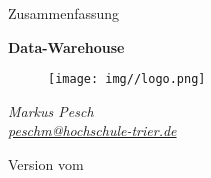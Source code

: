 \begin{titlepage}
  \begin{center}
    \begin{large}
      Zusammenfassung
    \end{large}

    \begin{huge}
      \begin{singlespace}
        \textbf{Data-Warehouse}
      \end{singlespace}
    \end{huge}

    \vspace{0.5cm}

    \begin{figure}[h]
      \centering
      \texttt{[image: img//logo.png]}
      \label{img:fh-trier-logo}
    \end{figure}

    \vspace{2cm}
    \begin{large}
      \textit{Markus Pesch} \\
      \href{mailto:peschm@hochschule-trier.de}{\textit{peschm@hochschule-trier.de}}
    \end{large}
    \vspace{2cm}

    Version  vom 

  \end{center}
\end{titlepage}
